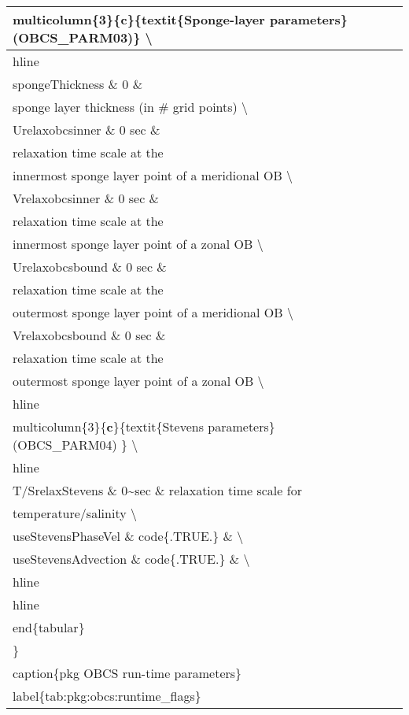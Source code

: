 \documentclass[letterpaper,10pt,english]{sphinxmanual}
\begin{document}
\begin{longtable}{|l|c|l|}
\hline
multicolumn\{3\}\{{\color{red}\bfseries{}\textbar{}c\textbar{}}\}\{textit\{Sponge-layer parameters\} (OBCS\_PARM03)\} \textbackslash{}
&&\\
\hline
hline
&&\\
\hline
spongeThickness \& 0 \&
&&\\
\hline
sponge layer thickness (in \# grid points) \textbackslash{}
&&\\
\hline
Urelaxobcsinner \& 0 sec \&
&&\\
\hline
relaxation time scale at the
&&\\
\hline
innermost sponge layer point of a meridional OB \textbackslash{}
&&\\
\hline
Vrelaxobcsinner \& 0 sec \&
&&\\
\hline
relaxation time scale at the
&&\\
\hline
innermost sponge layer point of a zonal OB \textbackslash{}
&&\\
\hline
Urelaxobcsbound \& 0 sec \&
&&\\
\hline
relaxation time scale at the
&&\\
\hline
outermost sponge layer point of a meridional OB \textbackslash{}
&&\\
\hline
Vrelaxobcsbound \& 0 sec \&
&&\\
\hline
relaxation time scale at the
&&\\
\hline
outermost sponge layer point of a zonal OB \textbackslash{}
&&\\
\hline
hline
&&\\
\hline
multicolumn\{3\}\{{\color{red}\bfseries{}\textbar{}c\textbar{}}\}\{textit\{Stevens parameters\} (OBCS\_PARM04) \} \textbackslash{}
&&\\
\hline
hline
&&\\
\hline
T/SrelaxStevens \& 0\textasciitilde{}sec \& relaxation time scale for
&&\\
\hline
temperature/salinity \textbackslash{}
&&\\
\hline
useStevensPhaseVel \& code\{.TRUE.\} \& \textbackslash{}
&&\\
\hline
useStevensAdvection \& code\{.TRUE.\} \& \textbackslash{}
&&\\
\hline
hline
&&\\
\hline
hline
&&\\
\hline
end\{tabular\}
&&\\
\hline
\}
&&\\
\hline
caption\{pkg OBCS run-time parameters\}
&&\\
\hline
label\{tab:pkg:obcs:runtime\_flags\}
&&\\
\hline\end{longtable}
\end{document}
